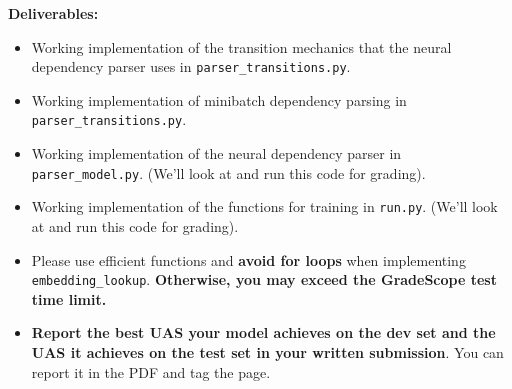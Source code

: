 \begin{parts}
\begin{enumerate}[label=\roman*.]
    \textbf{Deliverables:}
        \begin{itemize}
            \item Working implementation of the transition mechanics that the neural dependency parser uses in \texttt{parser\_transitions.py}. 
            \item Working implementation of minibatch dependency parsing in \texttt{parser\_transitions.py}.
            \item Working implementation of the neural dependency parser in \texttt{parser\_model.py}. (We'll look at and run this code for grading).
            \item Working implementation of the functions for training in \texttt{run.py}. (We'll look at and run this code for grading).
            \item Please use efficient functions and \textbf{avoid for loops} when implementing \texttt{embedding\_lookup}. \textbf{Otherwise, you may exceed the GradeScope test time limit.}
            \item \textbf{Report the best UAS your model achieves on the dev set and the UAS it achieves on the test set in your written submission}. You can report it in the PDF and tag the page.
    \end{itemize}
    \end{enumerate}


\end{parts}

